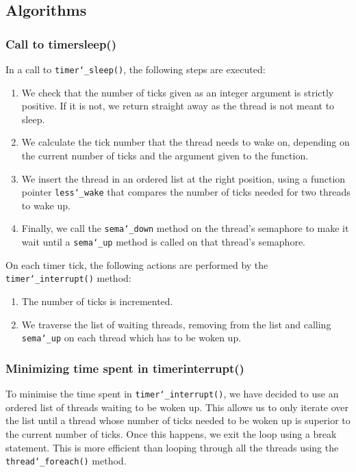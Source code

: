 \documentclass{article}
\renewcommand{\_}{\char`_}
\begin{document}
\subsection{Algorithms}
\subsubsection{Call to timer\textunderscore sleep()}

In a call to \texttt{timer\_sleep()}, the following steps are executed:

\begin{enumerate}
    \item We check that the number of ticks given as an integer argument is strictly positive. If it is not, we return straight away as the thread is not meant to sleep.
    \item We calculate the tick number that the thread needs to wake on, depending on the current number of ticks and the argument given to the function.
    \item We insert the thread in an ordered list at the right position, using a function pointer \texttt{less\_wake} that compares the number of ticks needed for two threads to wake up.
    \item Finally, we call the \texttt{sema\_down} method on the thread's semaphore to make it wait until a \texttt{sema\_up} method is called on that thread's semaphore.
\end{enumerate}

On each timer tick, the following actions are performed by the \texttt{timer\_interrupt()} method:

\begin{enumerate}
    \item The number of ticks is incremented.
    \item We traverse the list of waiting threads, removing from the list and calling \texttt{sema\_up} on each thread which has to be woken up.
\end{enumerate}

\subsubsection{Minimizing time spent in timer\textunderscore interrupt()}

To minimise the time spent in \texttt{timer\_interrupt()}, we have decided to use an ordered list of threads waiting to be woken up. This allows us to only iterate over the list until a thread whose number of ticks needed to be woken up is superior to the current number of ticks. Once this happens, we exit the loop using a break statement. This is more efficient than looping through all the threads using the \texttt{thread\_foreach()} method.
\end{document}
